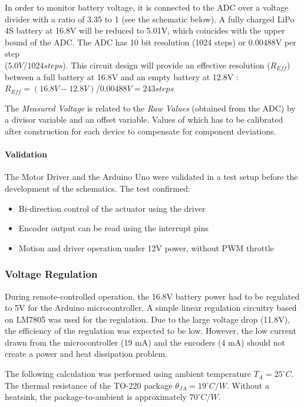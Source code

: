 In order to monitor battery voltage, it is connected to the ADC over a voltage divider with a ratio of 3.35 to 1 (see the schematic below). A fully charged LiPo 4S battery at 16.8V will be reduced to 5.01V, which coincides with the upper bound of the ADC. The ADC has 10 bit resolution (1024 steps) or 0.00488V per step \\($5.0V / 1024 steps$). This circuit design will provide an effective resolution ($R_{Eff}$) between a full battery at 16.8V and an empty battery at 12.8V : 
\\ $R_{Eff} = (16.8V - 12.8V) / 0.00488V = 243 steps$

The \textit{Measured Voltage} is related to the \textit{Raw Values} (obtained from the ADC) by a divisor variable and an offset variable. Values of which has to be calibrated after construction for each device to compensate for component deviations. 

\paragraph{Validation}

The Motor Driver and the Arduino Uno were validated in a test setup before the development of the schematics. The test confirmed:
\begin{itemize}
    \item Bi-direction control of the actuator using the driver
    \item Encoder output can be read using the interrupt pins
    \item Motion and driver operation under 12V power, without PWM throttle
\end{itemize}

\subsubsection{Voltage Regulation}
\label{subsubsection:exploration-1-voltage-regulation}

During remote-controlled operation, the 16.8V battery power had to be regulated to 5V for the Arduino microcontroller. A simple linear regulation circuitry based on LM7805 was used for the regulation. Due to the large voltage drop (11.8V), the efficiency of the regulation was expected to be low. However, the low current drawn from the microcontroller (19 mA) and the encoders (4 mA) should not create a power and heat dissipation problem.

The following calculation was performed using ambient temperature $T_A = 25^{\circ}C$. The thermal resistance of the TO-220 package $\theta_{JA} = 19^{\circ}C/W$. Without a heatsink, the package-to-ambient is approximately $70 ^{\circ}C/W$.

